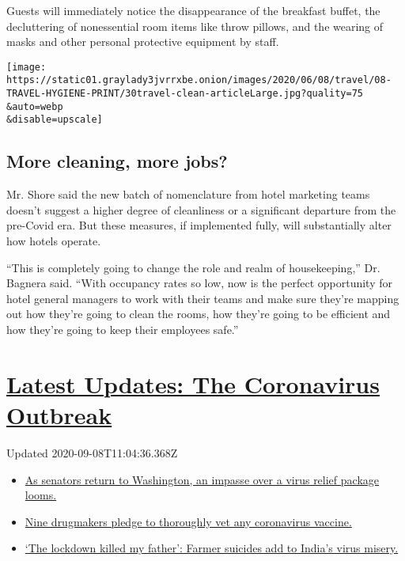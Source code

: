 Guests will immediately notice the disappearance of the breakfast
buffet, the decluttering of nonessential room items like throw pillows,
and the wearing of masks and other personal protective equipment by
staff.

\texttt{[image: https://static01.graylady3jvrrxbe.onion/images/2020/06/08/travel/08-TRAVEL-HYGIENE-PRINT/30travel-clean-articleLarge.jpg?quality=75\\\&auto=webp\\\&disable=upscale]}

\hypertarget{more-cleaning-more-jobs}{%
\subsection{More cleaning, more jobs?}\label{more-cleaning-more-jobs}}

Mr. Shore said the new batch of nomenclature from hotel marketing teams
doesn't suggest a higher degree of cleanliness or a significant
departure from the pre-Covid era. But these measures, if implemented
fully, will substantially alter how hotels operate.

``This is completely going to change the role and realm of
housekeeping,'' Dr. Bagnera said. ``With occupancy rates so low, now is
the perfect opportunity for hotel general managers to work with their
teams and make sure they're mapping out how they're going to clean the
rooms, how they're going to be efficient and how they're going to keep
their employees safe.''

\hypertarget{latest-updates-the-coronavirus-outbreak}{%
\section{\texorpdfstring{\href{https://www.nytimes3xbfgragh.onion/2020/09/08/world/covid-19-coronavirus.html?action=click\&pgtype=Article\&state=default\&region=MAIN_CONTENT_1\&context=storylines_live_updates}{Latest
Updates: The Coronavirus
Outbreak}}{Latest Updates: The Coronavirus Outbreak}}\label{latest-updates-the-coronavirus-outbreak}}

Updated 2020-09-08T11:04:36.368Z

\begin{itemize}
\tightlist
\item
  \href{https://www.nytimes3xbfgragh.onion/2020/09/08/world/covid-19-coronavirus.html?action=click\&pgtype=Article\&state=default\&region=MAIN_CONTENT_1\&context=storylines_live_updates\#link-4a77847f}{As
  senators return to Washington, an impasse over a virus relief package
  looms.}
\item
  \href{https://www.nytimes3xbfgragh.onion/2020/09/08/world/covid-19-coronavirus.html?action=click\&pgtype=Article\&state=default\&region=MAIN_CONTENT_1\&context=storylines_live_updates\#link-679303d7}{Nine
  drugmakers pledge to thoroughly vet any coronavirus vaccine.}
\item
  \href{https://www.nytimes3xbfgragh.onion/2020/09/08/world/covid-19-coronavirus.html?action=click\&pgtype=Article\&state=default\&region=MAIN_CONTENT_1\&context=storylines_live_updates\#link-1c973131}{`The
  lockdown killed my father': Farmer suicides add to India's virus
  misery.}
\end{itemize}

